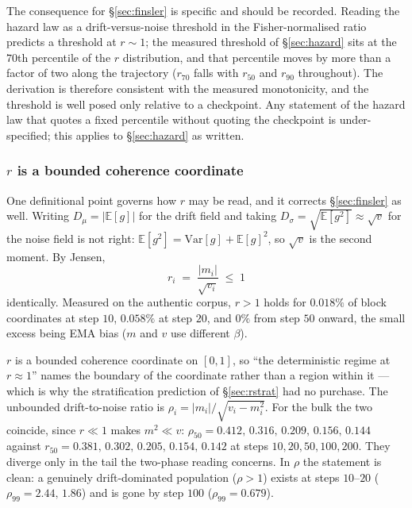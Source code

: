 The consequence for \S\ref{sec:finsler} is specific and should be recorded.
Reading the hazard law as a drift-versus-noise threshold in the
Fisher-normalised ratio predicts a threshold at $r\sim1$; the measured
threshold of \S\ref{sec:hazard} sits at the $70$th percentile of the $r$
distribution, and that percentile moves by more than a factor of two along the
trajectory ($r_{70}$ falls with $r_{50}$ and $r_{90}$ throughout). The
derivation is therefore consistent with the measured monotonicity, and the
threshold is well posed only relative to a checkpoint. Any statement of the
hazard law that quotes a fixed percentile without quoting the checkpoint is
under-specified; this applies to \S\ref{sec:hazard} as written.

\subsubsection*{$r$ is a bounded coherence coordinate}

One definitional point governs how $r$ may be read, and it corrects
\S\ref{sec:finsler} as well. Writing $D_\mu=|\mathbb{E}[g]|$ for the drift
field and taking $D_\sigma=\sqrt{\mathbb{E}[g^2]}\approx\sqrt{v}$ for the noise
field is not right: $\mathbb{E}[g^2]=\mathrm{Var}[g]+\mathbb{E}[g]^2$, so
$\sqrt{v}$ is the second moment. By Jensen,
\[
r_i \;=\; \frac{|m_i|}{\sqrt{v_i}} \;\le\; 1
\]
identically. Measured on the authentic corpus, $r>1$ holds for $0.018\%$ of
block coordinates at step $10$, $0.058\%$ at step $20$, and $0\%$ from step
$50$ onward, the small excess being EMA bias ($m$ and $v$ use different
$\beta$).

\begin{observation}
\label{obs:r-bounded}
$r$ is a bounded coherence coordinate on $[0,1]$, so ``the deterministic regime
at $r\approx1$'' names the boundary of the coordinate rather than a region
within it --- which is why the stratification prediction of
\S\ref{sec:rstrat} had no purchase. The unbounded drift-to-noise ratio is
$\rho_i=|m_i|/\sqrt{v_i-m_i^2}$. For the bulk the two coincide, since $r\ll1$
makes $m^2\ll v$: $\rho_{50}=0.412,\,0.316,\,0.209,\,0.156,\,0.144$ against
$r_{50}=0.381,\,0.302,\,0.205,\,0.154,\,0.142$ at steps
$10,20,50,100,200$. They diverge only in the tail the two-phase reading
concerns. In $\rho$ the statement is clean: a genuinely drift-dominated
population ($\rho>1$) exists at steps $10$--$20$ ($\rho_{99}=2.44,\,1.86$) and
is gone by step $100$ ($\rho_{99}=0.679$).
\end{observation}


